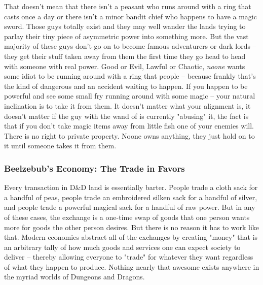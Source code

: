 That doesn't mean that there isn't a peasant who runs around with a ring that casts  once a day or there isn't a minor bandit chief who happens to have a magic sword. Those guys totally exist and they may well wander the lands trying to parlay their tiny piece of asymmetric power into something more. But the vast majority of these guys don't go on to become famous adventurers or dark lords -- they get their stuff taken away from them the first time they go head to head with someone with real power. Good or Evil, Lawful or Chaotic, \textit{noone} wants some idiot to be running around with a ring that  people -- because frankly that's the kind of dangerous and an accident waiting to happen. If you happen to be powerful and see some small fry running around with some magic -- your natural inclination is to take it from them. It doesn't matter what your alignment is, it doesn't matter if the guy with the wand of  is currently "abusing" it, the fact is that if you don't take magic items away from little fish one of your enemies will. There is no right to private property. Noone owns anything, they just hold on to it until someone takes it from them.

\subsubsection{Beelzebub's Economy: The Trade in Favors}
\vspace*{-8pt}

Every transaction in D\&D land is essentially barter. People trade a cloth sack for a handful of peas, people trade an embroidered silken sack for a handful of silver, and people trade a powerful magical sack for a handful of raw power. But in any of these cases, the exchange is a one-time swap of goods that one person wants more for goods the other person desires. But there is no reason it has to work like that. Modern economies abstract all of the exchanges by creating "money" that is an arbitrary tally of how much goods and services one can expect society to deliver -- thereby allowing everyone to "trade" for whatever they want regardless of what they happen to produce. Nothing nearly that awesome exists anywhere in the myriad worlds of Dungeons and Dragons.

